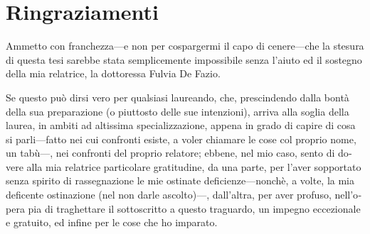 \chapter{Ringraziamenti}

\begin{otherlanguage}{italian}
Ammetto con franchezza---e non per cospargermi il capo di cenere---che la stesura di questa tesi sarebbe stata semplicemente impossibile senza l'aiuto ed il sostegno della mia relatrice, la dottoressa Fulvia De Fazio.

Se questo può dirsi vero per qualsiasi laureando, che, prescindendo dalla bontà della sua preparazione (o piuttosto delle sue intenzioni), arriva alla soglia della laurea, in ambiti ad altissima specializzazione, appena in grado di capire di cosa si parli---fatto nei cui confronti esiste, a voler chiamare le cose col proprio nome, un tabù---, nei confronti del proprio relatore; ebbene, nel mio caso, sento di dovere alla mia relatrice particolare gratitudine, da una parte, per l'aver sopportato senza spirito di rassegnazione le mie ostinate deficienze---nonchè, a volte, la mia deficente ostinazione (nel non darle ascolto)---, dall'altra, per aver profuso, nell'opera pia di traghettare il sottoscritto a questo traguardo, un impegno eccezionale e gratuito, ed infine per le cose che ho imparato.
\end{otherlanguage}
